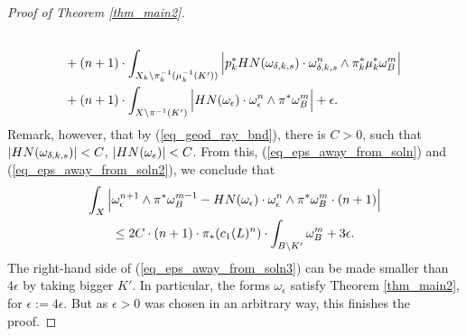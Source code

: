 \documentclass[10pt,a4paper]{amsart}
\begin{document}
\begin{proof}[Proof of Theorem \ref{thm_main2}]
\begin{equation}
\begin{aligned}
			\\
			&
			{\phantom{\leq}}
			+
			(n + 1)
			\cdot
			\int_{X_k \setminus \pi_k^{-1} (\mu_k^{-1}(K'))}
			\Big|
			p_k^* {\rm{HN}}(\omega_{\delta, k, s}) \cdot \omega_{\delta, k, s}^n \wedge  \pi_k^* \mu_k^* \omega_B^m
			\Big|
			\\
			&
			{\phantom{\leq}}
			+
			(n + 1)
			\cdot
			\int_{X \setminus \pi^{-1} (K')}
			\Big|
			{\rm{HN}}(\omega_{\epsilon}) \cdot \omega_{\epsilon}^n \wedge  \pi^* \omega_B^m
			\Big| + \epsilon.
		\end{aligned}
		\end{equation}
		Remark, however, that by (\ref{eq_geod_ray_bnd}), there is $C > 0$, such that $|{\rm{HN}}(\omega_{\delta, k, s})| < C$, $|{\rm{HN}}(\omega_{\epsilon})| < C$.
		From this, (\ref{eq_eps_away_from_soln}) and (\ref{eq_eps_away_from_soln2}), we conclude that 
		\begin{multline}\label{eq_eps_away_from_soln3}
			\int_{X}
			\Big|
			\omega_{\epsilon}^{n + 1} \wedge \pi^* \omega_B^{m - 1}
			-
			{\rm{HN}}(\omega_{\epsilon}) \cdot \omega_{\epsilon}^n \wedge  \pi^* \omega_B^m \cdot (n + 1)
			\Big|
			\\
			\leq
			2 C \cdot (n + 1) \cdot
			\pi_* (c_1(L)^n)
			\cdot
			\int_{B \setminus K'} \omega_B^m 
			+
			3 \epsilon.
		\end{multline}
		The right-hand side of (\ref{eq_eps_away_from_soln3}) can be made smaller than $4 \epsilon$ by taking bigger $K'$.
		In particular, the forms $\omega_{\epsilon}$ satisfy Theorem \ref{thm_main2}, for $\epsilon := 4 \epsilon$.
		But as $\epsilon > 0$ was chosen in an arbitrary way, this finishes the proof.
	\end{proof}
\end{document}
